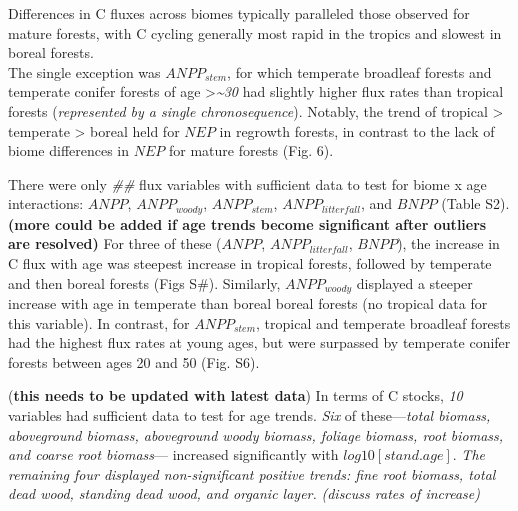 \documentclass[
]{article}
\begin{document}
Differences in C fluxes across biomes typically paralleled those
observed for mature forests, with C cycling generally most rapid in the
tropics and slowest in boreal forests.\\
The single exception was \(ANPP_{stem}\), for which temperate broadleaf
forests and temperate conifer forests of age
\textgreater{}\emph{\textasciitilde30} had slightly higher flux rates
than tropical forests (\emph{represented by a single chronosequence}).
Notably, the trend of tropical \textgreater{} temperate \textgreater{}
boreal held for \(NEP\) in regrowth forests, in contrast to the lack of
biome differences in \(NEP\) for mature forests (Fig. 6).

There were only \emph{\#\#} flux variables with sufficient data to test
for biome x age interactions: \(ANPP\), \(ANPP_{woody}\),
\(ANPP_{stem}\), \(ANPP_{litterfall}\), and \(BNPP\) (Table S2).
\textbf{(more could be added if age trends become significant after
outliers are resolved)} For three of these (\(ANPP\),
\(ANPP_{litterfall}\), \(BNPP\)), the increase in C flux with age was
steepest increase in tropical forests, followed by temperate and then
boreal forests (Figs S\#). Similarly, \(ANPP_{woody}\) displayed a
steeper increase with age in temperate than boreal boreal forests (no
tropical data for this variable). In contrast, for \(ANPP_{stem}\),
tropical and temperate broadleaf forests had the highest flux rates at
young ages, but were surpassed by temperate conifer forests between ages
20 and 50 (Fig. S6).

(\textbf{this needs to be updated with latest data}) In terms of C
stocks, \emph{10} variables had sufficient data to test for age trends.
\emph{Six} of these---\emph{total biomass, aboveground biomass,
aboveground woody biomass, foliage biomass, root biomass, and coarse
root biomass}--- increased significantly with \(log10[stand.age]\).
\emph{The remaining four displayed non-significant positive trends: fine
root biomass, total dead wood, standing dead wood, and organic layer.}
\emph{(discuss rates of increase)}
\end{document}
